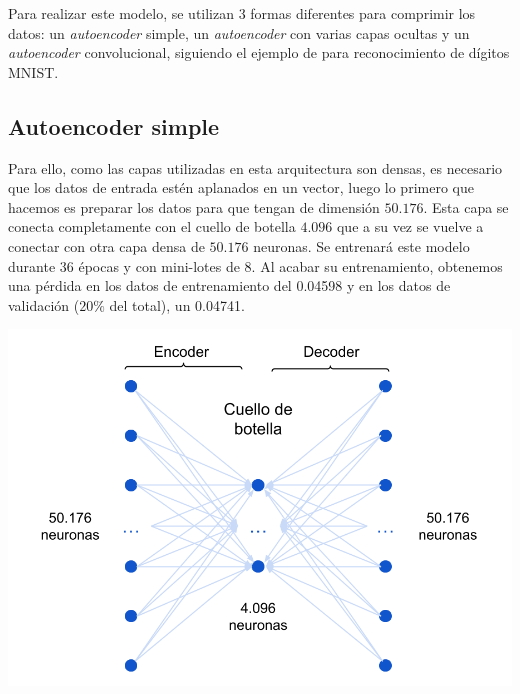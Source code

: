 Para realizar este modelo, se utilizan 3 formas diferentes para comprimir los datos: un \textit{autoencoder} simple, un \textit{autoencoder} con varias capas ocultas y un \textit{autoencoder} convolucional, siguiendo el ejemplo de \citep{aekeras} para reconocimiento de dígitos MNIST. 

\bigskip
\bigskip

\begin{minipage}{0.55\textwidth}
    \subsection{Autoencoder simple}
    
    Para ello, como las capas utilizadas en esta arquitectura son densas, es necesario que los datos de entrada estén aplanados en un vector, luego lo primero que hacemos es preparar los datos para que tengan de dimensión $50.176$. Esta capa se conecta completamente con el cuello de botella $4.096$ que a su vez se vuelve a conectar con otra capa densa de $50.176$ neuronas. Se entrenará este modelo durante 36 épocas y con mini-lotes de 8. Al acabar su entrenamiento, obtenemos una pérdida en los datos de entrenamiento del 0.04598 y en los datos de validación ($20\%$ del total), un 0.04741. 

\end{minipage}
\begin{minipage}{0.02\textwidth}
    \textbf{ }
\end{minipage}
\begin{minipage}{0.35\textwidth}
    \includegraphics[width=1.1\textwidth]{img/aeMMC.png}
    \label{img: aeMMC}
\end{minipage}

